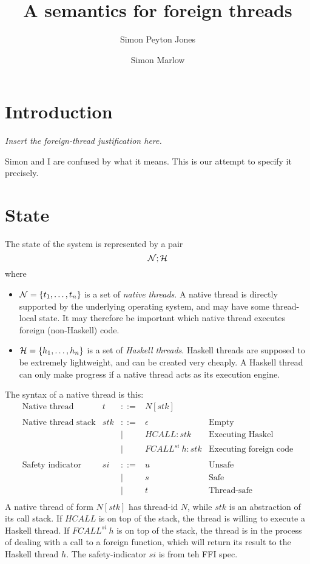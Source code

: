 \documentclass{article}
\newcommand{\NS}{{\cal N}}
\newcommand{\HS}{{\cal H}}
\newcommand{\hcall}{HCALL}
\newcommand{\fcall}[2]{FCALL^{#1}~#2}
\begin{document}
\title{A semantics for foreign threads}

\author{Simon Peyton Jones \and Simon Marlow}


\makeatactive

\section{Introduction}

\emph{Insert the foreign-thread justification here.}

Simon and I are confused by what it means. This is our attempt to specify it precisely.

\section{State}

The state of the system is represented by a pair
$$\NS ; \HS$$
where 
\begin{itemize}
\item $\NS = \{t_1, \ldots ,t_n\}$ is a set of \emph{native threads}.
A native thread is directly supported by the underlying operating
system, and may have some thread-local state. It may therefore
be important which native thread executes foreign
(non-Haskell) code.

\item $\HS = \{h_1, \ldots ,h_n\}$ is a set of \emph{Haskell threads}.
Haskell threads are supposed to be extremely lightweight, and
can be created very cheaply. A Haskell thread can only make progress
if a native thread acts as its execution engine.
\end{itemize}

The syntax of a native thread is this:
$$
\begin{array}{lrcll}
\mbox{Native thread} &  t & ::= & N[stk] \\
\\
\mbox{Native thread stack} &  stk & ::= & \epsilon & \mbox{Empty}\\
	& & | & \hcall : stk  & \mbox{Executing Haskel} \\
	& & | & \fcall{si}{h} : stk & \mbox{Executing foreign code}\\
\\
\mbox{Safety indicator} &  si & ::= & u & \mbox{Unsafe} \\
	& & | & s & \mbox{Safe} \\
	& & | & t & \mbox{Thread-safe} \\
\end{array}
$$
A native thread of form $N[stk]$ has thread-id $N$, while $stk$ is
an abstraction of its call stack.  If $\hcall$ is on top of the stack,
the thread is willing to execute a Haskell thread.  If $\fcall{si}{h}$ is
on top of the stack, the thread is in the process of dealing with a call
to a foreign function, which will return its result to the Haskell thread
$h$.  The safety-indicator $si$ is from teh FFI spec.
\end{document}
